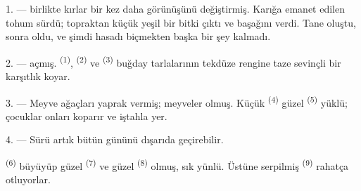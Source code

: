 %
%


\VUsaut{5.0mm}
\VUsaut{3.0mm}
\VUsaut{3.0mm}
\VUsaut{4.0mm}
\VUsaut{3.0mm}

1. ---  birlikte kırlar bir kez daha görünüşünü değiştirmiş.
Karığa emanet edilen tohum sürdü; topraktan küçük yeşil bir bitki çıktı ve
başağını verdi. Tane oluştu, sonra oldu, ve şimdi hasadı biçmekten başka bir
şey kalmadı.

2. ---  açmış. 
\textsuperscript{(1)},  \textsuperscript{(2)} ve
 \textsuperscript{(3)} buğday tarlalarının tekdüze rengine
taze  sevinçli bir karşıtlık koyar.

3. --- Meyve ağaçları yaprak vermiş; meyveler olmuş. Küçük
 \textsuperscript{(4)} güzel 
\textsuperscript{(5)} yüklü; çocuklar onları koparır ve iştahla yer.

4. --- Sürü artık bütün gününü dışarıda geçirebilir.

 \textsuperscript{(6)} büyüyüp güzel 
\textsuperscript{(7)} ve güzel  \textsuperscript{(8)} olmuş,
sık yünlü. Üstüne  serpilmiş 
\textsuperscript{(9)}  rahatça otluyorlar.

